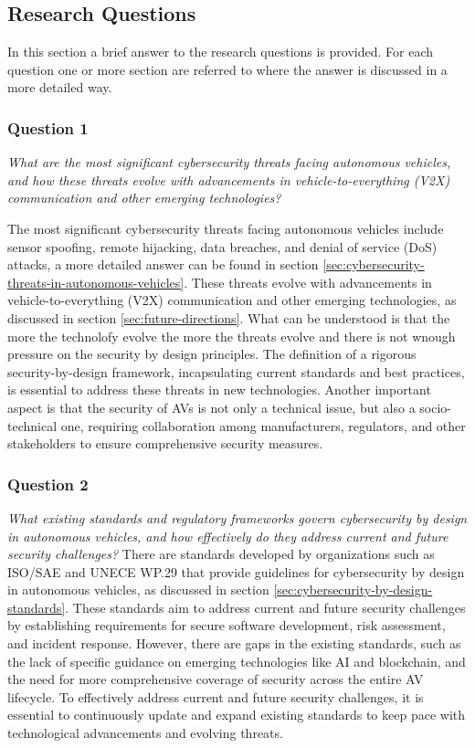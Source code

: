 \subsection{Research Questions}\label{subsec:research-questions}
In this section a brief answer to the research questions is provided.
For each question one or more section are referred to where the answer is discussed in a more detailed way.

\subsubsection{Question 1}
\textit{What are the most significant cybersecurity threats facing autonomous vehicles, and how these threats evolve with advancements in vehicle-to-everything (V2X) communication and other emerging technologies?}

The most significant cybersecurity threats facing autonomous vehicles include sensor spoofing, remote hijacking, data breaches, and denial of service (DoS) attacks, a more detailed answer can be found in section \ref{sec:cybersecurity-threats-in-autonomous-vehicles}.
These threats evolve with advancements in vehicle-to-everything (V2X) communication and other emerging technologies, as discussed in section \ref{sec:future-directions}.
What can be understood is that the more the technolofy evolve the more the threats evolve and there is not wnough pressure on the security by design principles.
The definition of a rigorous security-by-design framework,  incapsulating current standards and best practices, is essential to address these threats in new technologies.
Another  important aspect is that the security of AVs is not only a technical issue, but also a socio-technical one, requiring collaboration among manufacturers, regulators, and other stakeholders to ensure comprehensive security measures.

\subsubsection{Question 2}
\textit{What existing standards and regulatory frameworks govern cybersecurity by design in autonomous vehicles, and how effectively do they address current and future security challenges?}
There are standards developed by organizations such as ISO/SAE and UNECE WP.29 that provide guidelines for cybersecurity by design in autonomous vehicles, as discussed in section \ref{sec:cybersecurity-by-design-standards}.
These standards aim to address current and future security challenges by establishing requirements for secure software development, risk assessment, and incident response.
However, there are gaps in the existing standards, such as the lack of specific guidance on emerging technologies like AI and blockchain, and the need for more comprehensive coverage of security across the entire AV lifecycle.
To effectively address current and future security challenges, it is essential to continuously update and expand existing standards to keep pace with technological advancements and evolving threats.

